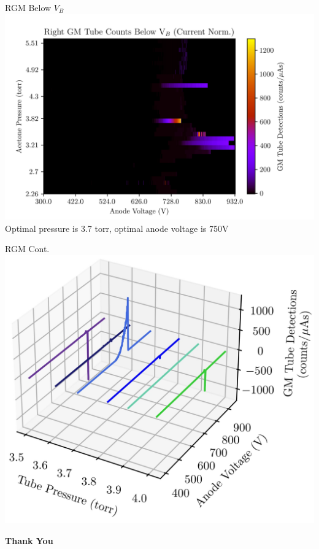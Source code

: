 \documentclass[12pt, aspectratio=169]{beamer}
\begin{document}
\begin{frame}{RGM Below $V_B$}
    \centering
    \includegraphics[scale=0.65]{Figs/RGMFinalNorm.jpg}\\
    Optimal pressure is 3.7 torr, optimal anode voltage is 750V
\end{frame}

\begin{frame}{RGM Cont.}
    \centering
    \includegraphics[scale=0.9]{Figs/Plots/RGM Waterfall.jpg}
\end{frame}

\begin{frame}
    \centering
    \vfill
    \Huge\textbf{Thank You}
\end{frame}
\end{document}
